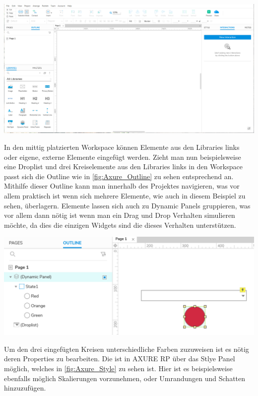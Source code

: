 \begin{center}
  \includegraphics[scale=0.4]{figures/Axure_Full.png}
  \label{fig:Axure_Full}
\end{center}

In den mittig platzierten Workspace können Elemente aus den Libraries links oder eigene, externe Elemente eingefügt werden.
Zieht man nun beispielsweise eine Droplist und drei Kreiselemente aus den Libraries links in den Workspace passt sich die Outline wie in \cref{fig:Axure_Outline} zu sehen entsprechend an.
Mithilfe dieser Outline kann man innerhalb des Projektes navigieren, was vor allem praktisch ist wenn sich mehrere Elemente, wie auch in diesem Beispiel zu sehen, überlagern.
Elemente lassen sich auch zu Dynamic Panels gruppieren, was vor allem dann nötig ist wenn man ein Drag und Drop Verhalten simulieren möchte, da dies die einzigen Widgets sind die dieses Verhalten unterstützen.

\begin{center}
  \includegraphics[scale=0.4]{figures/AXURE_Outline.PNG}
  \label{fig:Axure_Outline}
\end{center}

Um den drei eingefügten Kreisen unterschiedliche Farben zuzuweisen ist es nötig deren Properties zu bearbeiten.
Die ist in AXURE RP über das Stlye Panel möglich, welches in \cref{fig:Axure_Style} zu sehen ist.
Hier ist es beispielsweise ebenfalls möglich Skalierungen vorzunehmen, oder Umrandungen und Schatten hinzuzufügen.

